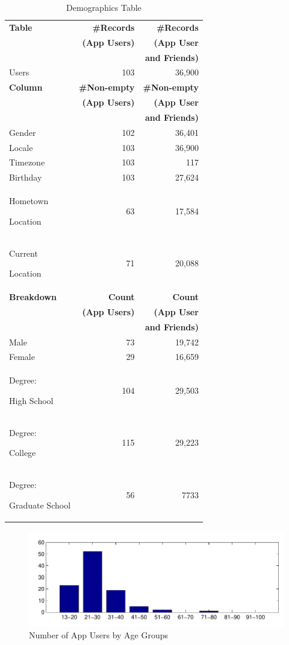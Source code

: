 \begin{table}
\centering
\caption{\small Demographics Table}
\label{tab:demographics}
\begin{tabular}{|>{\small}p{2cm}|>{\small}r|>{\small}r|}
\hline
\textbf{Table} & \textbf{\#Records} & \textbf{\#Records} \\
& \textbf{(App Users)} & \textbf{(App User} \\
& & \textbf{and Friends)} \\
\hline
Users & 103 & 36,900 \\
\hline
\hline
\textbf{Column} & \textbf{\#Non-empty} & \textbf{\#Non-empty} \\
& \textbf{(App Users)} & \textbf{(App User} \\
& & \textbf{and Friends)} \\
\hline
Gender & 102 & 36,401 \\
\hline
Locale & 103 & 36,900 \\
\hline
Timezone & 103 & 117 \\
\hline
Birthday & 103 & 27,624 \\
\hline
Hometown\par Location & 63 & 17,584 \\
\hline
Current\par Location & 71 & 20,088 \\
\hline
\hline
\textbf{Breakdown} & \textbf{Count} & \textbf{Count} \\
& \textbf{(App Users)} & \textbf{(App User} \\
& & \textbf{and Friends)} \\
\hline
Male & 73 & 19,742 \\
\hline
Female & 29 & 16,659 \\
\hline
Degree:\par High School & 104 & 29,503 \\
\hline
Degree:\par College & 115 & 29,223 \\
\hline
Degree:\par Graduate School & 56 & 7733 \\
\hline
\end{tabular}
\end{table}


\begin{figure}[t!]
\centering
\includegraphics[scale=0.5]{data/age_groups_linkr_users.pdf}
\vspace{-15pt}
\caption{\small Number of App Users by Age Groups}
\label{fig:agegroups:users}
\end{figure}

